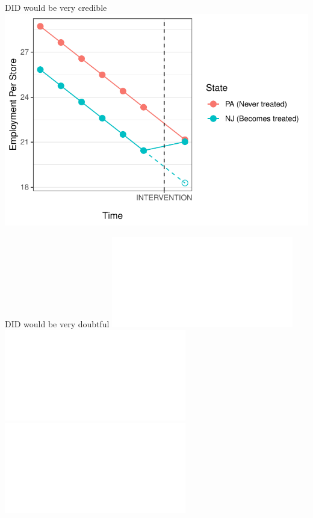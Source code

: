 \documentclass{beamer}
\begin{document}
\begin{frame}[t]{DID would be very credible}
\includegraphics[width = \textwidth]{figures/parallel_trends_credible.pdf}
\end{frame}

\begin{frame}[t]{DID would be very doubtful}
\includegraphics<1>[width = \textwidth]{figures/parallel_trends_doubtful.pdf}
\includegraphics<2>[width = \textwidth]{figures/parallel_trends_doubtful_2.pdf}
\includegraphics<3>[width = \textwidth]{figures/parallel_trends_doubtful_3.pdf}
\end{frame}
\end{document}
